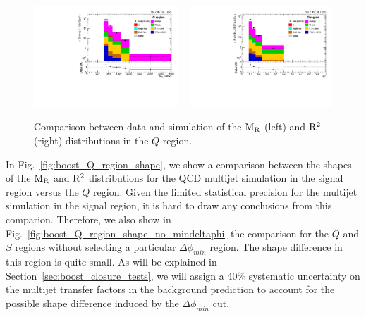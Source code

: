 \begin{figure}[htbp]
\centering
\includegraphics[width=0.48\textwidth]
{figures/razor_selection/plots/DataMC_MR_0Lbg1uW0Ll_mdPhi0p3_width}
~
\includegraphics[width=0.48\textwidth]
{figures/razor_selection/plots/DataMC_R2_0Lbg1uW0Ll_mdPhi0p3_width}
\caption{Comparison between data and simulation of the $\mathrm{M_R}$ (left) and $\mathrm{R^2}$ (right)
distributions in the $Q$ region. 
\label{fig:boost_Q_region_MR_Rsq}}
\end{figure}

% 
% 
% 


In Fig.~\ref{fig:boost_Q_region_shape}, we show a comparison between the shapes of the $\mathrm{M_R}$ and
$\mathrm{R^2}$ distributions for the QCD multijet simulation in the signal region versus the $Q$ region.
Given the limited statistical precision for the multijet simulation in the signal region, it is
hard to draw any conclusions from this comparion. Therefore, we also show in
Fig.~\ref{fig:boost_Q_region_shape_no_mindeltaphi} the comparison for the $Q$ and $S$ regions
without selecting a particular $\Delta\phi_{min}$ region. The shape difference in this
region is quite small. As will be explained in Section~\ref{sec:boost_closure_tests}, we will assign
a 40\% systematic uncertainty on the multijet transfer factors in the background prediction to
account for the possible shape difference induced by the $\Delta\phi_{min}$ cut. 

